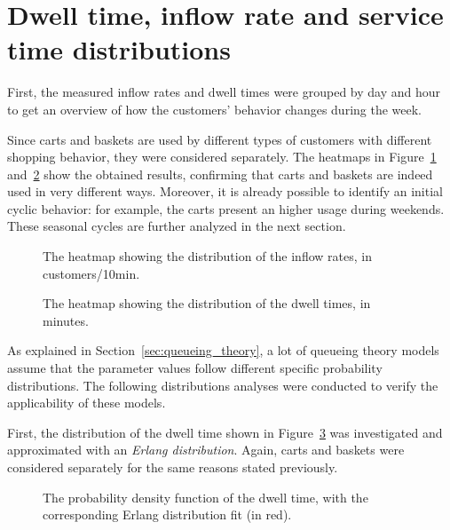 \section{Dwell time, inflow rate and service time distributions}
\label{sec:dwell_time_inflow_rate_service_time_distributions}

First, the measured inflow rates and dwell times were grouped by day and hour to get an overview of how the customers’ behavior changes during the week.

Since carts and baskets are used by different types of customers with different shopping behavior, they were considered separately. The heatmaps in Figure~\ref{fig:inflow_rate_heatmap} and~\ref{fig:dwell_time_heatmap} show the obtained results, confirming that carts and baskets are indeed used in very different ways. Moreover, it is already possible to identify an initial cyclic behavior: for example, the carts present an higher usage during weekends. These seasonal cycles are further analyzed in the next section.

\begin{figure}
  \begin{center}
  \end{center}
  \caption{The heatmap showing the distribution of the inflow rates, in customers/10min.}
  \label{fig:inflow_rate_heatmap}
\end{figure}

\begin{figure}
  \begin{center}
  \end{center}
  \caption{The heatmap showing the distribution of the dwell times, in minutes.}
  \label{fig:dwell_time_heatmap}
\end{figure}

As explained in Section~\ref{sec:queueing_theory}, a lot of queueing theory models assume that the parameter values follow different specific probability distributions. The following distributions analyses were conducted to verify the applicability of these models.

First, the distribution of the dwell time shown in Figure~\ref{fig:dwell_time_distribution} was investigated and approximated with an \emph{Erlang distribution}. Again, carts and baskets were considered separately for the same reasons stated previously.

\begin{figure}
  \begin{center}
  \end{center}
  \caption{The probability density function of the dwell time, with the corresponding Erlang distribution fit (in red).}
  \label{fig:dwell_time_distribution}
\end{figure}

